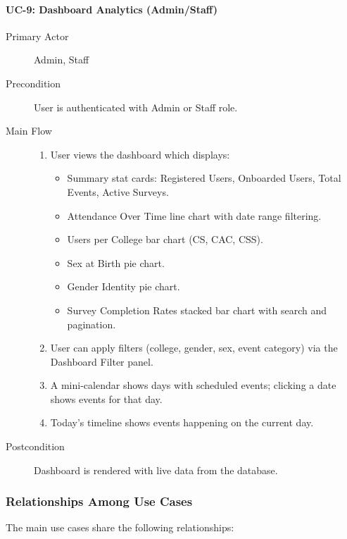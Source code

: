 \documentclass[11pt,a4paper]{article}
\begin{document}
\paragraph{UC-9: Dashboard Analytics (Admin/Staff)}
\begin{description}
  \item[Primary Actor] Admin, Staff
  \item[Precondition] User is authenticated with Admin or Staff role.
  \item[Main Flow]
    \begin{enumerate}[leftmargin=1.5em]
      \item User views the dashboard which displays:
        \begin{itemize}
          \item Summary stat cards: Registered Users, Onboarded Users, Total Events, Active Surveys.
          \item Attendance Over Time line chart with date range filtering.
          \item Users per College bar chart (CS, CAC, CSS).
          \item Sex at Birth pie chart.
          \item Gender Identity pie chart.
          \item Survey Completion Rates stacked bar chart with search and pagination.
        \end{itemize}
      \item User can apply filters (college, gender, sex, event category) via the Dashboard Filter panel.
      \item A mini-calendar shows days with scheduled events; clicking a date shows events for that day.
      \item Today's timeline shows events happening on the current day.
    \end{enumerate}
  \item[Postcondition] Dashboard is rendered with live data from the database.
\end{description}


\subsubsection{Relationships Among Use Cases}

The main use cases share the following relationships:
\end{document}
